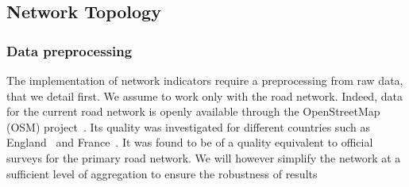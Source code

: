 \documentclass[11pt]{article}
\begin{document}


\subsection{Network Topology}

\subsubsection{Data preprocessing}

The implementation of network indicators require a preprocessing from raw data, that we detail first. We assume to work only with the road network. Indeed, data for the current road network is openly available through the OpenStreetMap (OSM) project~\citep{openstreetmap}. Its quality was investigated for different countries such as England~\cite{haklay2010good} and France~\cite{girres2010quality}. It was found to be of a quality equivalent to official surveys for the primary road network. We will however simplify the network at a sufficient level of aggregation to ensure the robustness of results

\end{document}
